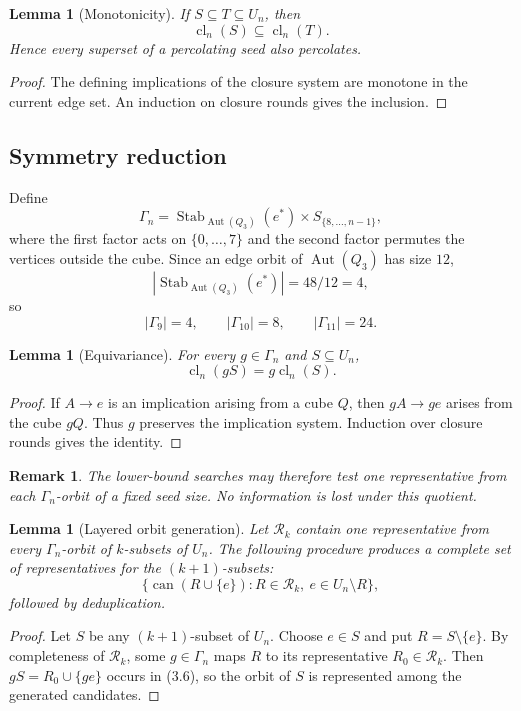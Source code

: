 \documentclass[11pt]{article}
\numberwithin{equation}{section}
\newtheorem{lemma}[theorem]{Lemma}
\newtheorem{remark}[theorem]{Remark}
\newcommand{\cl}{\operatorname{cl}}
\newcommand{\Aut}{\operatorname{Aut}}
\newcommand{\Stab}{\operatorname{Stab}}
\begin{document}
\begin{lemma}[Monotonicity]\label{lem:mono}
If $S\subseteq T\subseteq U_n$, then
\[
\cl_n(S)\subseteq\cl_n(T).
\]
Hence every superset of a percolating seed also percolates.
\end{lemma}

\begin{proof}
The defining implications of the closure system are monotone in the current edge set. An induction on closure rounds gives the inclusion.
\end{proof}

\subsection{Symmetry reduction}
Define
\[
\Gamma_n=
\Stab_{\Aut(Q_3)}(e^*)\times S_{\{8,\ldots,n-1\}},
\tag{3.4}
\]
where the first factor acts on $\{0,\ldots,7\}$ and the second factor permutes the vertices outside the cube. Since an edge orbit of $\Aut(Q_3)$ has size $12$,
\[
|\Stab_{\Aut(Q_3)}(e^*)|=48/12=4,
\]
so
\[
|\Gamma_9|=4,\qquad |\Gamma_{10}|=8,\qquad |\Gamma_{11}|=24.
\tag{3.5}
\]

\begin{lemma}[Equivariance]\label{lem:equiv}
For every $g\in\Gamma_n$ and $S\subseteq U_n$,
\[
\cl_n(gS)=g\cl_n(S).
\]
\end{lemma}

\begin{proof}
If $A\to e$ is an implication arising from a cube $Q$, then $gA\to ge$ arises from the cube $gQ$. Thus $g$ preserves the implication system. Induction over closure rounds gives the identity.
\end{proof}

\begin{remark}
The lower-bound searches may therefore test one representative from each $\Gamma_n$-orbit of a fixed seed size. No information is lost under this quotient.
\end{remark}

\begin{lemma}[Layered orbit generation]\label{lem:layer}
Let $\mathcal R_k$ contain one representative from every $\Gamma_n$-orbit of $k$-subsets of $U_n$. The following procedure produces a complete set of representatives for the $(k+1)$-subsets:
\[
\{\operatorname{can}(R\cup\{e\}):R\in\mathcal R_k,\ e\in U_n\setminus R\},
\tag{3.6}
\]
followed by deduplication.
\end{lemma}

\begin{proof}
Let $S$ be any $(k+1)$-subset of $U_n$. Choose $e\in S$ and put $R=S\setminus\{e\}$. By completeness of $\mathcal R_k$, some $g\in\Gamma_n$ maps $R$ to its representative $R_0\in\mathcal R_k$. Then $gS=R_0\cup\{ge\}$ occurs in (3.6), so the orbit of $S$ is represented among the generated candidates.
\end{proof}
\end{document}
